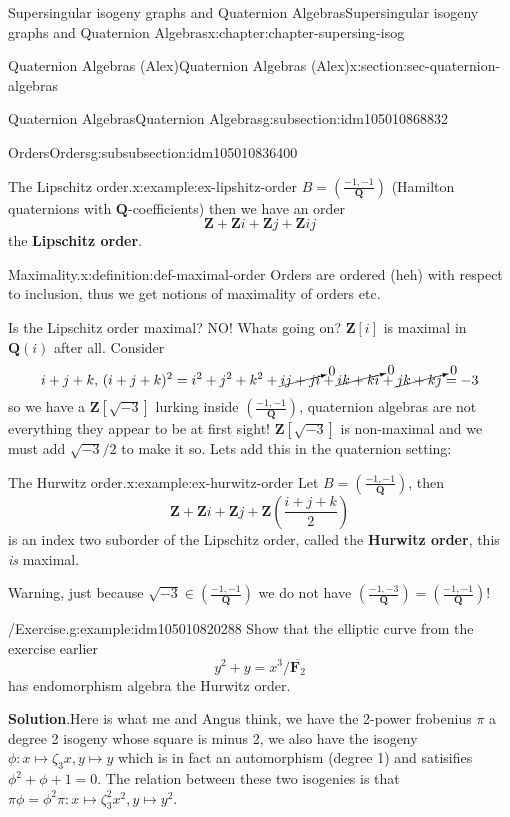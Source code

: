\documentclass[oneside,10pt,]{book}
\newcommand{\terminology}[1]{\textbf{#1}}
\numberwithin{equation}{section}
\newcommand{\legendre}[2]{\left(\frac{#1}{#2}\right)}
\newcommand{\lb}{[}
\newcommand{\rb}{]}
\newcommand{\ZZ}{\mathbf{Z}}
\newcommand{\QQ}{\mathbf{Q}}
\newcommand{\FF}{\mathbf{F}}
\begin{document}
\begin{chapterptx}{Supersingular isogeny graphs and Quaternion Algebras}{}{Supersingular isogeny graphs and Quaternion Algebras}{}{}{x:chapter:chapter-supersing-isog}
\begin{sectionptx}{Quaternion Algebras (Alex)}{}{Quaternion Algebras (Alex)}{}{}{x:section:sec-quaternion-algebras}
\begin{subsectionptx}{Quaternion Algebras}{}{Quaternion Algebras}{}{}{g:subsection:idm105010868832}
\begin{subsubsectionptx}{Orders}{}{Orders}{}{}{g:subsubsection:idm105010836400}
\begin{example}{The Lipschitz order.}{x:example:ex-lipshitz-order}
\(B = \legendre{-1,-1}{\QQ}\) (Hamilton quaternions with \(\QQ\)-coefficients) then we have an order%
\begin{equation*}
\ZZ + \ZZ i + \ZZ j + \ZZ ij
\end{equation*}
the \terminology{Lipschitz order}.%
\end{example}
\begin{definition}{Maximality.}{x:definition:def-maximal-order}%
Orders are ordered (heh) with respect to inclusion, thus we get notions of maximality of orders etc.%
\end{definition}
Is the Lipschitz order maximal? NO! Whats going on? \(\ZZ\lb i\rb\) is maximal in \(\QQ(i)\) after all. Consider%
\begin{equation*}
i + j + k,\,(i+j + k)^2 = i^2 + j^2 + k^2 + \cancelto{0}{ij + ji} + \cancelto{0}{ik + ki} + \cancelto{0}{jk + kj} = -3
\end{equation*}
so we have a \(\ZZ\lb \sqrt{-3}\rb\) lurking inside \(\legendre{-1,-1}{\QQ}\), quaternion algebras are not everything they appear to be at first sight! \(\ZZ\lb \sqrt{-3}\rb\) is non-maximal and we must add \(\sqrt{-3}/2\) to make it so. Lets add this in the quaternion setting:%
\begin{example}{The Hurwitz order.}{x:example:ex-hurwitz-order}%
Let \(B = \legendre{-1,-1}{\QQ}\), then%
\begin{equation*}
\ZZ+  \ZZ i + \ZZ j + \ZZ \left(\frac{i + j + k}{2}\right)
\end{equation*}
is an index two suborder of the Lipschitz order, called the \terminology{Hurwitz order}, this \emph{is} maximal.%
\end{example}
Warning, just because \(\sqrt{-3} \in \legendre{-1,-1}{\QQ}\) we do not have \(\legendre{-1,-3}{\QQ} = \legendre{-1,-1}{\QQ}\)!%
\begin{example}{\slash{}Exercise.}{g:example:idm105010820288}%
Show that the elliptic curve from the exercise earlier%
\begin{equation*}
y^2 + y = x^3/\overline{\FF_2}
\end{equation*}
has endomorphism algebra the Hurwitz order.%
\par\smallskip%
\noindent\textbf{Solution}.\hypertarget{g:solution:idm105010818976}{}\quad{}Here is what me and Angus think, we have the 2-power frobenius \(\pi\) a degree 2 isogeny whose square is minus 2, we also have the isogeny \(\phi \colon x\mapsto \zeta_3 x, y\mapsto y\) which is in fact an automorphism (degree 1) and satisifies \(\phi^2 + \phi + 1 = 0\). The relation between these two isogenies is that \(\pi \phi  = \phi^2 \pi \colon x\mapsto \zeta_3^2 x^2, y\mapsto y^2\).%

\end{example}
\end{subsubsectionptx}
\end{subsectionptx}
\end{sectionptx}
\end{chapterptx}
\end{document}
